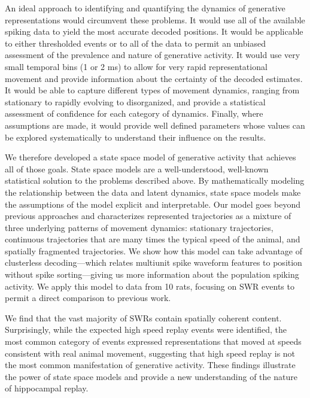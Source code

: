 \documentclass[times, twoside]{zHenriquesLab-StyleBioRxiv}
\begin{document}
An ideal approach to identifying and quantifying the dynamics of generative representations would circumvent these problems. It would use all of the available spiking data to yield the most accurate decoded positions. It would be applicable to either thresholded events or to all of the data to permit an unbiased assessment of the prevalence and nature of generative activity. It would use very small temporal bins (1 or 2 ms) to allow for very rapid representational movement and provide information about the certainty of the decoded estimates. It would be able to capture different types of movement dynamics, ranging from stationary to rapidly evolving to disorganized, and provide a statistical assessment of confidence for each category of dynamics. Finally, where assumptions are made, it would provide well defined parameters whose values can be explored systematically to understand their influence on the results.

We therefore developed a state space model of generative activity that achieves all of those goals. State space models are a well-understood, well-known statistical solution to the problems described above. By mathematically modeling the relationship between the data and latent dynamics, state space models make the assumptions of the model explicit and interpretable. Our model goes beyond previous approaches \cite{MaboudiUncoveringtemporalstructure2018, DengRapidclassificationhippocampal2016} and characterizes represented trajectories as a mixture of three underlying patterns of movement dynamics: stationary trajectories, continuous trajectories that are many times the typical speed of the animal, and spatially fragmented trajectories. We show how this model can take advantage of clusterless decoding---which relates multiunit spike waveform features to position without spike sorting---giving us more information about the population spiking activity. We apply this model to data from 10 rats, focusing on SWR events to permit a direct comparison to previous work. 

We find that the vast majority of SWRs contain spatially coherent content. Surprisingly, while the expected high speed replay events were identified, the most common category of events expressed representations that moved at speeds consistent with real animal movement, suggesting that high speed replay is not the most common manifestation of generative activity. These findings illustrate the power of state space models and provide a new understanding of the nature of hippocampal replay.
\end{document}
